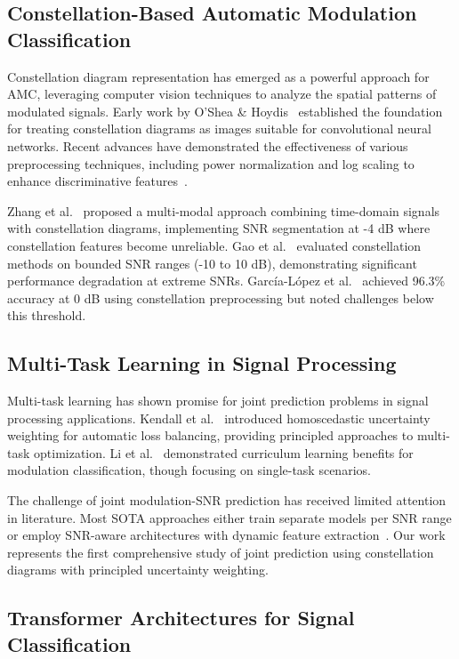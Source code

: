 \documentclass{ELSP}
\begin{document}
\subsection{Constellation-Based Automatic Modulation Classification}

Constellation diagram representation has emerged as a powerful approach for AMC, leveraging computer vision techniques to analyze the spatial patterns of modulated signals. Early work by O'Shea \& Hoydis~\cite{oshea2017} established the foundation for treating constellation diagrams as images suitable for convolutional neural networks. Recent advances have demonstrated the effectiveness of various preprocessing techniques, including power normalization and log scaling to enhance discriminative features~\cite{mendis2019,wang2020}.

Zhang et al.~\cite{zhang2023multimodal} proposed a multi-modal approach combining time-domain signals with constellation diagrams, implementing SNR segmentation at -4 dB where constellation features become unreliable. Gao et al.~\cite{gao2023robust} evaluated constellation methods on bounded SNR ranges (-10 to 10 dB), demonstrating significant performance degradation at extreme SNRs. García-López et al.~\cite{garcia2024ultralight} achieved 96.3\% accuracy at 0 dB using constellation preprocessing but noted challenges below this threshold.

\subsection{Multi-Task Learning in Signal Processing}

Multi-task learning has shown promise for joint prediction problems in signal processing applications. Kendall et al.~\cite{kendall2018} introduced homoscedastic uncertainty weighting for automatic loss balancing, providing principled approaches to multi-task optimization. Li et al.~\cite{li2019curriculum} demonstrated curriculum learning benefits for modulation classification, though focusing on single-task scenarios.

The challenge of joint modulation-SNR prediction has received limited attention in literature. Most SOTA approaches either train separate models per SNR range or employ SNR-aware architectures with dynamic feature extraction~\cite{liu2020survey}. Our work represents the first comprehensive study of joint prediction using constellation diagrams with principled uncertainty weighting.

\subsection{Transformer Architectures for Signal Classification}
\end{document}

